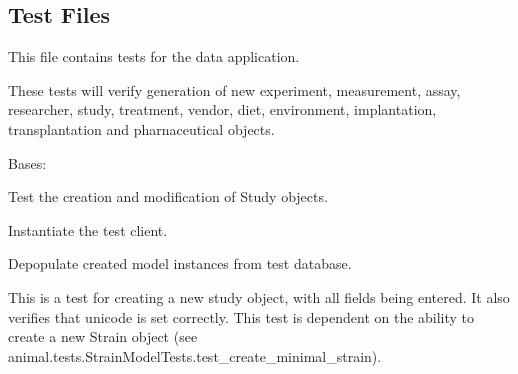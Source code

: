 \documentclass[letterpaper,10pt,english]{sphinxmanual}
\begin{document}
\subsection{Test Files}
\label{api:id2}\label{api:module-mousedb.data.tests}
This file contains tests for the data application.

These tests will verify generation of new experiment, measurement, assay, researcher, study, treatment, vendor, diet, environment, implantation, transplantation and pharnaceutical objects.


\begin{fulllineitems}
\label{api:mousedb.data.tests.StudyModelTests}
Bases: 

Test the creation and modification of Study objects.


\begin{fulllineitems}
\label{api:mousedb.data.tests.StudyModelTests.setUp}
Instantiate the test client.

\end{fulllineitems}



\begin{fulllineitems}
\label{api:mousedb.data.tests.StudyModelTests.tearDown}
Depopulate created model instances from test database.

\end{fulllineitems}



\begin{fulllineitems}
\label{api:mousedb.data.tests.StudyModelTests.test_create_studey_detailed}
This is a test for creating a new study object, with all fields being entered.  It also verifies that unicode is set correctly.  This test is dependent on the ability to create a new Strain object (see animal.tests.StrainModelTests.test\_create\_minimal\_strain).


\end{fulllineitems}
\end{fulllineitems}
\end{document}
